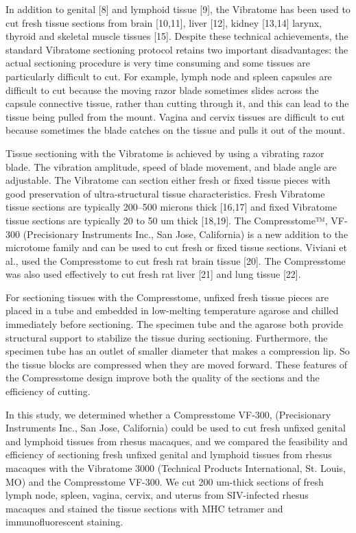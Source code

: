 \documentclass{article}
\begin{document}
In addition to genital [8] and lymphoid tissue [9], the Vibratome has been used to cut fresh tissue sections from brain [10,11], liver [12], kidney [13,14] larynx, thyroid and skeletal muscle tissues [15]. Despite these technical achievements, the standard Vibratome sectioning protocol retains two important disadvantages: the actual sectioning procedure is very time consuming and some tissues are particularly difficult to cut. For example, lymph node and spleen capsules are difficult to cut because the moving razor blade sometimes slides across the capsule connective tissue, rather than cutting through it, and this can lead to the tissue being pulled from the mount. Vagina and cervix tissues are difficult to cut because sometimes the blade catches on the tissue and pulls it out of the mount.

Tissue sectioning with the Vibratome is achieved by using a vibrating razor blade. The vibration amplitude, speed of blade movement, and blade angle are adjustable. The Vibratome can section either fresh or fixed tissue pieces with good preservation of ultra-structural tissue characteristics. Fresh Vibratome tissue sections are typically 200–500 microns thick [16,17] and fixed Vibratome tissue sections are typically 20 to 50 um thick [18,19]. The Compresstome™, VF-300 (Precisionary Instruments Inc., San Jose, California) is a new addition to the microtome family and can be used to cut fresh or fixed tissue sections. Viviani et al., used the Compresstome to cut fresh rat brain tissue [20]. The Compresstome was also used effectively to cut fresh rat liver [21] and lung tissue [22].

For sectioning tissues with the Compresstome, unfixed fresh tissue pieces are placed in a tube and embedded in low-melting temperature agarose and chilled immediately before sectioning. The specimen tube and the agarose both provide structural support to stabilize the tissue during sectioning. Furthermore, the specimen tube has an outlet of smaller diameter that makes a compression lip. So the tissue blocks are compressed when they are moved forward. These features of the Compresstome design improve both the quality of the sections and the efficiency of cutting.

In this study, we determined whether a Compresstome VF-300, (Precisionary Instruments Inc., San Jose, California) could be used to cut fresh unfixed genital and lymphoid tissues from rhesus macaques, and we compared the feasibility and efficiency of sectioning fresh unfixed genital and lymphoid tissues from rhesus macaques with the Vibratome 3000 (Technical Products International, St. Louis, MO) and the Compresstome VF-300. We cut 200 um-thick sections of fresh lymph node, spleen, vagina, cervix, and uterus from SIV-infected rhesus macaques and stained the tissue sections with MHC tetramer and immunofluorescent staining.
\end{document}
